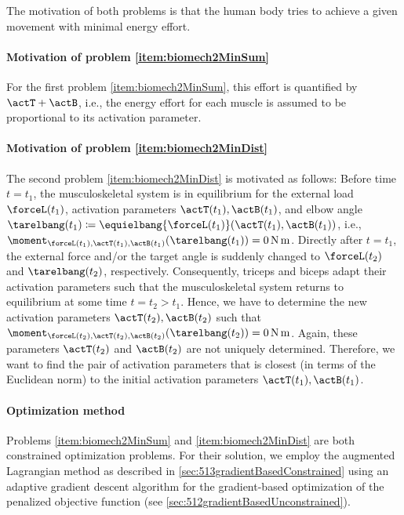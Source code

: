 \noindent
The motivation of both problems is that the human body tries to
achieve a given movement with minimal energy effort.

\paragraph{Motivation of problem \ref{item:biomech2MinSum}}

For the first problem \ref{item:biomech2MinSum},
this effort is quantified by $\actT + \actB$,
i.e., the energy effort for each muscle is assumed to be proportional
to its activation parameter.

\paragraph{Motivation of problem \ref{item:biomech2MinDist}}

The second problem \ref{item:biomech2MinDist} is motivated as follows:
Before time $t = t_1$, the musculoskeletal system is in equilibrium for
the external load $\forceL(t_1)$,
activation parameters $\actT(t_1), \actB(t_1)$, and elbow angle
$\tarelbang(t_1) \ceq \equielbang{\forceL(t_1)}(\actT(t_1), \actB(t_1))$, i.e.,
$\moment_{\forceL(t_1),\actT(t_1),\actB(t_1)}(\tarelbang(t_1))
= \SI{0}{\newton\meter}$.
Directly after $t = t_1$,
the external force and/or the target angle is suddenly changed
to $\forceL(t_2)$ and $\tarelbang(t_2)$, respectively.
Consequently, triceps and biceps adapt their activation parameters
such that the musculoskeletal system returns to equilibrium
at some time $t = t_2 > t_1$.
Hence, we have to determine the new activation parameters
$\actT(t_2), \actB(t_2)$ such that
$\moment_{\forceL(t_2),\actT(t_2),\actB(t_2)}(\tarelbang(t_2))
= \SI{0}{\newton\meter}$.
Again, these parameters
$\actT(t_2)$ and $\actB(t_2)$ are not uniquely determined.
Therefore, we want to find the pair of activation parameters
that is closest (in terms of the Euclidean norm) to the initial
activation parameters $\actT(t_1), \actB(t_1)$.

\paragraph{Optimization method}

Problems \ref{item:biomech2MinSum} and \ref{item:biomech2MinDist}
are both constrained optimization problems.
For their solution, we employ the augmented Lagrangian method as
described in \cref{sec:513gradientBasedConstrained}
using an adaptive gradient descent algorithm
for the gradient-based optimization of the penalized objective function
(see \cref{sec:512gradientBasedUnconstrained}).



